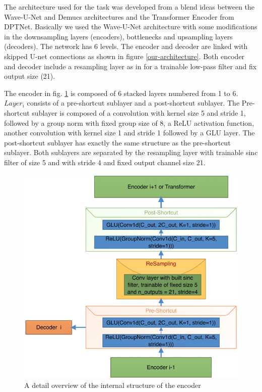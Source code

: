 \documentclass[final]{cvpr}
\begin{document}
The architecture used for the task was developed from a blend ideas between the Wave-U-Net \cite{waveunet} and Demucs \cite{defossez2019music} architectures and the Transformer Encoder from DPTNet\cite{dptnet}.
Basically we used the Wave-U-Net \cite{waveunet} architecture with some modifications in the downsampling layers (encoders), bottlenecks and upsampling layers (decoders).
The network has 6 levels. The encoder and decoder are linked with skipped U-net connections as shown in figure \ref{our-architecture}. Both encoder and decoder include a resampling layer as in \cite{waveunet} for a trainable low-pass filter and fix output size (21). 

The encoder in fig. \ref{encoder} is composed of 6 stacked layers numbered from 1 to 6. $Layer_i$ consists of a pre-shortcut sublayer and a post-shortcut sublayer. The Pre-shortcut sublayer is composed of a convolution with kernel size 5 and stride 1, followed by a group norm with fixed group size of 8, a ReLU activation function, another convolution with kernel size 1 and stride 1 followed by a GLU layer. The post-shortcut sublayer has exactly the same structure as the pre-shortcut sublayer. Both sublayers are separated by the resampling layer \cite{waveunet} with trainable sinc filter of size 5 and with stride 4 and fixed output channel size 21.

\begin{figure}
   \includegraphics[scale=0.3]{encoder.png}
   \caption{A detail overview of the internal structure of the encoder}
   \label{encoder}
\end{figure}
\end{document}
